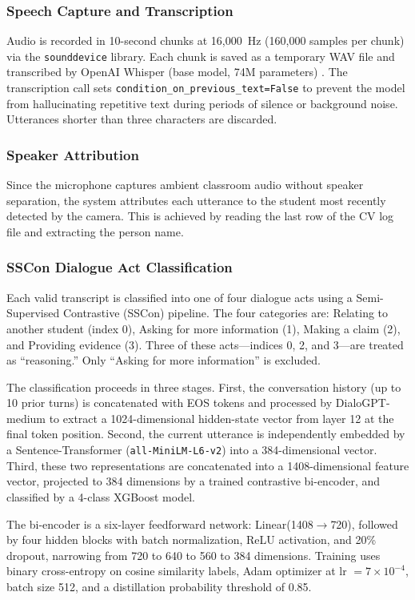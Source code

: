\documentclass[conference]{IEEEtran}
\begin{document}
\subsubsection{Speech Capture and Transcription}
Audio is recorded in 10-second chunks at 16,000~Hz (160,000 samples per chunk) via the \texttt{sounddevice} library. Each chunk is saved as a temporary WAV file and transcribed by OpenAI Whisper (base model, 74M parameters) \cite{b5}. The transcription call sets \texttt{condition\_on\_previous\_text=False} to prevent the model from hallucinating repetitive text during periods of silence or background noise. Utterances shorter than three characters are discarded.

\subsubsection{Speaker Attribution}
Since the microphone captures ambient classroom audio without speaker separation, the system attributes each utterance to the student most recently detected by the camera. This is achieved by reading the last row of the CV log file and extracting the person name.

\subsubsection{SSCon Dialogue Act Classification}
Each valid transcript is classified into one of four dialogue acts using a Semi-Supervised Contrastive (SSCon) pipeline. The four categories are: Relating to another student (index 0), Asking for more information (1), Making a claim (2), and Providing evidence (3). Three of these acts---indices 0, 2, and 3---are treated as ``reasoning.'' Only ``Asking for more information'' is excluded.

The classification proceeds in three stages. First, the conversation history (up to 10 prior turns) is concatenated with EOS tokens and processed by DialoGPT-medium \cite{b6} to extract a 1024-dimensional hidden-state vector from layer 12 at the final token position. Second, the current utterance is independently embedded by a Sentence-Transformer (\texttt{all-MiniLM-L6-v2}) \cite{b3} into a 384-dimensional vector. Third, these two representations are concatenated into a 1408-dimensional feature vector, projected to 384 dimensions by a trained contrastive bi-encoder, and classified by a 4-class XGBoost model.

The bi-encoder is a six-layer feedforward network: Linear(1408$\rightarrow$720), followed by four hidden blocks with batch normalization, ReLU activation, and 20\% dropout, narrowing from 720 to 640 to 560 to 384 dimensions. Training uses binary cross-entropy on cosine similarity labels, Adam optimizer at lr $= 7 \times 10^{-4}$, batch size 512, and a distillation probability threshold of 0.85.
\end{document}
